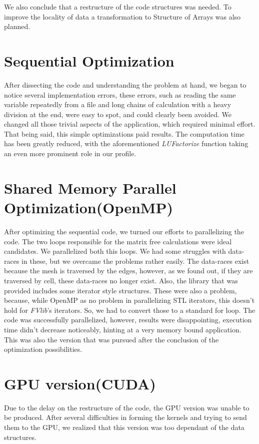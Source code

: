 \documentclass[a4paper,10pt,openright,openbib,twocolumn]{article}
\begin{document}
We also conclude that a restructure of the code structures was needed. To improve the locality of data a transformation to Structure of Arrays was also planned.

\section{Sequential Optimization}


After dissecting the code and understanding the problem at hand, we began to notice several implementation errors, these errors, such as reading the same variable repeatedly from a file and long chains of calculation with a heavy division at the end, were easy to spot, and could clearly been avoided. We changed all those trivial aspects of the application, which required minimal effort. That being said, this simple optimizations paid results. The computation time has been greatly reduced, with the aforementioned \emph{LUFactorize} function taking an even more prominent role in our profile.

\section{Shared Memory Parallel Optimization(OpenMP)}

After optimizing the sequential code, we turned our efforts to parallelizing the code. The two loops responsible for the matrix free calculations were ideal candidates. We parallelized both this loops. We had some struggles with data-races in these, but we overcame the problems rather easily. The data-races exist because the mesh is traversed by the edges, however, as we found out, if they are traversed by cell, these data-races no longer exist. Also, the library that was provided includes some iterator style structures. These were also a problem, because, while OpenMP as no problem in parallelizing STL iterators, this doesn't hold for \emph{FVlib}'s iterators. So, we had to convert those to a standard for loop. The code was successfully parallelized, however, results were disappointing, execution time didn't decrease noticeably, hinting at a very memory bound application.
This was also the version that was pursued after the conclusion of the optimization possibilities.

\section{GPU version(CUDA)}

Due to the delay on the restructure of the code, the GPU version was unable to be produced. After several difficulties in forming the kernels and trying to send them to the GPU, we realized that this version was too dependant of the data structures.
\end{document}

